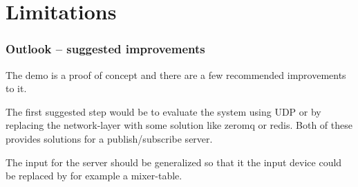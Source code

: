 \chapter{Limitations}

\subsection*{Outlook -- suggested improvements}
The demo is a proof of concept and there are a few recommended improvements to it. 

The first suggested step would be to evaluate the system using UDP or by replacing the network-layer with some solution like zeromq or redis. Both of these provides solutions for a publish/subscribe server. 

The input for the server should be generalized so that it the input device could be replaced by for example a mixer-table. 
